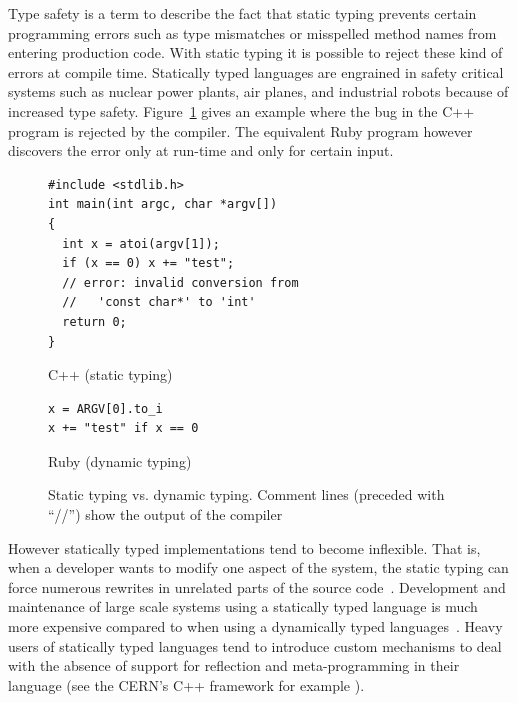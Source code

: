 \documentclass[12pt,a4paper,oneside,openright]{book}
\newcommand{\Ie}{That is, }
\newcommand{\fig}[1]{Figure~\ref{fig:#1}}
\newcommand{\ccout}{Comment lines (preceded with ``//'') show the output of the compiler}
\begin{document}
\begin{CJK}{UTF8}{}
Type safety is a term to describe the fact that static typing prevents certain programming errors such as type mismatches or misspelled method names from entering production code. With static typing it is possible to reject these kind of errors at compile time. Statically typed languages are engrained in safety critical systems such as nuclear power plants, air planes, and industrial robots because of increased type safety. \fig{typing} gives an example where the bug in the C++ program is rejected by the compiler. The equivalent Ruby program however discovers the error only at run-time and only for certain input.
\begin{figure}[htbp]
  \begin{center}
    \begin{minipage}[b]{.5\textwidth}
      \begin{center}
        \lstset{language=C++,frame=single,numbers=none}
        \begin{lstlisting}
#include <stdlib.h>
int main(int argc, char *argv[])
{
  int x = atoi(argv[1]);
  if (x == 0) x += "test";
  // error: invalid conversion from
  //   'const char*' to 'int'
  return 0;
}
        \end{lstlisting}
        C++ (static typing)
      \end{center}
    \end{minipage}\hspace{3ex}
    \begin{minipage}[b]{.3\textwidth}
      \begin{center}
        \lstset{language=Ruby,frame=single,numbers=none}
        \begin{lstlisting}
x = ARGV[0].to_i
x += "test" if x == 0
        \end{lstlisting}
        Ruby (dynamic typing)
      \end{center}
    \end{minipage}
  \end{center}
  \caption{Static typing vs. dynamic typing. \ccout\label{fig:typing}}
\end{figure}

However statically typed implementations tend to become inflexible. \Ie when a developer wants to modify one aspect of the system, the static typing can force numerous rewrites in unrelated parts of the source code~\citep{RefWorks:486}. Development and maintenance of large scale systems using a statically typed language is much more expensive compared to when using a dynamically typed languages~\citep{RefWorks:311}. Heavy users of statically typed languages tend to introduce custom mechanisms to deal with the absence of support for reflection and meta-programming in their language (see the CERN's C++ framework for example \cite{Antcheva20092499}).


\end{CJK}
\end{document}
